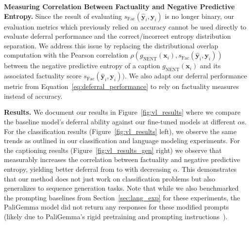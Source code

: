 \textbf{Measuring Correlation Between Factuality and Negative Predictive Entropy.} Since the result of evaluating $s_{\text{Fac}}(\hat{\mathbf{y}}_i, \mathbf{y}_i)$ is no longer binary, our evaluation metrics which previously relied on accuracy cannot be used directly to evaluate deferral performance and the correct/incorrect entropy distribution separation. We address this issue by replacing the distributional overlap computation with the Pearson correlation $\rho(g_{\text{NENT}}(\mathbf{x}_i), s_{\text{Fac}}(\hat{\mathbf{y}}_i, \mathbf{y}_i))$ between the negative predictive entropy of a caption $g_{\text{NENT}}(\mathbf{x}_i)$ and its associated factuality score $s_{\text{Fac}}(\hat{\mathbf{y}}_i, \mathbf{y}_i))$. We also adapt our deferral performance metric from Equation~\eqref{eq:deferral_performance} to rely on factuality measures instead of accuracy. 

\textbf{Results.}  We document our results in Figure~\ref{fig:vl_results} where we compare the baseline model's deferral ability against our fine-tuned models at different $\alpha$s. For the classification results (Figure~\ref{fig:vl_results} left), we observe the same trends as outlined in our classification and language modeling experiments. For the captioning results (Figure~\ref{fig:vl_results_gen} right) we observe that \loss measurably increases the correlation between factuality and negative predictive entropy, yielding better deferral from \smallmodel to \bigmodel with decreasing $\alpha$. This demonstrates that our method does not just work on classification problems but also generalizes to sequence generation tasks. Note that while we also benchmarked the prompting baselines from Section~\ref{sec:lang_exp} for these experiments, the PaliGemma model did not return any responses for these modified prompts (likely due to PaliGemma's rigid pretraining and prompting instructions~\citep{beyer2024paligemma}).